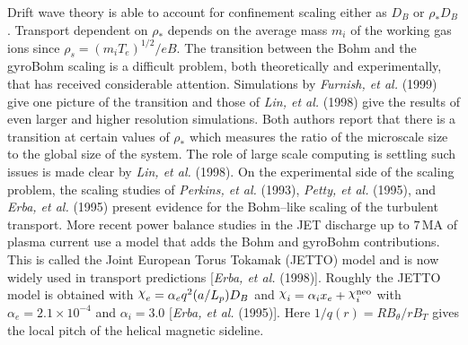 \documentclass[a4paper,openany,12pt]{book}
\def\chix{\raise.5ex\hbox{$\chi$}}
\begin{document}
Drift wave theory is able to account for confinement scaling either as $D_B$ or $\rho_* D_B$. Transport dependent on $\rho_*$ depends on the average mass $m_i$ of the working gas ions since $\rho_s=(m_i T_e)^{1/2}/eB$. The transition between the Bohm and the gyroBohm scaling is a difficult problem, both theoretically and experimentally, that has received considerable attention. Simulations by \emph{Furnish, et al.} (1999) give one picture of the transition and those of \emph{Lin, et al.} (1998) give the results of even larger and higher resolution simulations. Both authors report that there is a transition at certain values of  $\rho_*$ which measures the ratio of the microscale size to the global size of the system. The role of large scale computing is settling such issues is made clear by \emph{Lin, et al.} (1998). On the experimental side of the scaling problem, the scaling studies of \emph{Perkins, et al.} (1993), \emph{Petty, et al.} (1995), and \emph{Erba, et al.} (1995) present evidence for the Bohm--like scaling of the turbulent transport. More recent power balance studies in the JET discharge up to $7\,$MA of plasma current use a model that adds the Bohm and gyroBohm contributions. This is called the Joint European Torus Tokamak (JETTO) model and is now widely used in transport predictions [\emph{Erba, et al.} (1998)]. Roughly the JETTO model is obtained with $\chix_e=\alpha_e q^2(a/L_p)D_B$ and $\chix_i=\alpha_i x_e+\chix_i^{\rm neo}$ with $\alpha_e=2.1\times 10^{-4}$ and $\alpha_i=3.0$ [\emph{Erba, et al.} (1995)]. Here $1/q(r)=RB_\theta/rB_T$ gives the local pitch of the helical magnetic sideline.
\end{document}
